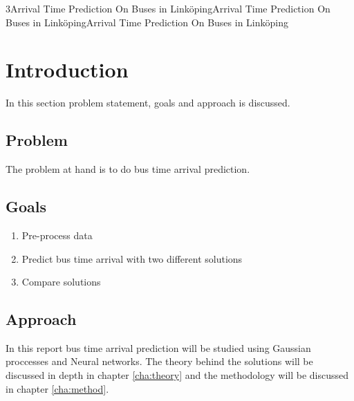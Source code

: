 
3Arrival Time Prediction On Buses in LinköpingArrival Time Prediction On Buses in LinköpingArrival Time Prediction On Buses in Linköping%


\chapter{Introduction}
\label{cha:introduction}

In this section problem statement, goals and approach is discussed.

\section{Problem}
\label{sec:problem}

The problem at hand is to do bus time arrival prediction. 

\section{Goals}
\label{sec:aim}

\begin{enumerate}
  \item Pre-process data
  \item Predict bus time arrival with two different solutions
  \item Compare solutions
\end{enumerate}

\section{Approach}
\label{sec:research-questions}

In this report bus time arrival prediction will be studied using Gaussian proccesses and Neural networks. The theory behind the solutions will be discussed in depth in chapter \ref{cha:theory} and the methodology will be discussed in chapter \ref{cha:method}.

